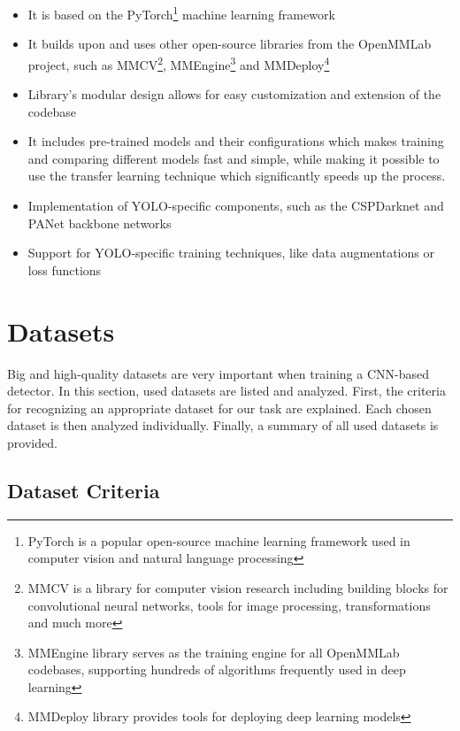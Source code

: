 \begin{itemize}
    \item It is based on the PyTorch\footnote{PyTorch is a popular open-source
    machine learning framework used in computer vision and natural language
    processing} machine learning framework
    \item It builds upon and uses other open-source libraries from the OpenMMLab
    project, such as MMCV\footnote{MMCV is a library for computer vision
    research including building blocks for convolutional neural networks, tools
    for image processing, transformations and much more},
    MMEngine\footnote{MMEngine library serves as the training engine for all
    OpenMMLab codebases, supporting hundreds of algorithms frequently used in
    deep learning} and MMDeploy\footnote{MMDeploy library provides tools for
    deploying deep learning models}
    \item Library's modular design allows for easy customization and extension
    of the codebase
    \item It includes pre-trained models and their configurations which makes
    training and comparing different models fast and simple, while making it
    possible to use the transfer learning technique which significantly speeds up the
    process.
    \item Implementation of YOLO-specific components, such as the CSPDarknet and
    PANet backbone networks
    \item Support for YOLO-specific training techniques, like data augmentations
    or loss functions
\end{itemize}





\section{Datasets}

Big and high-quality datasets are very important when training a CNN-based
detector. In this section, used datasets are listed and analyzed. First, the
criteria for recognizing an appropriate dataset for our task are explained. Each
chosen dataset is then analyzed individually. Finally, a summary of all used
datasets is provided.

\subsection{Dataset Criteria}

